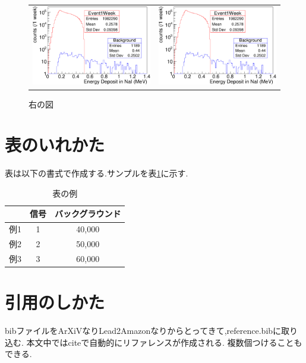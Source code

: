 \begin{figure}[tb]
\begin{tabular}{cc}
\centering

\begin{minipage}{0.5\hsize}
	\includegraphics[width=7cm]{fig/figure.pdf}
	\caption{左の図}
	\label{fig:test3}
\end{minipage}&

\begin{minipage}{0.5\hsize}
	\includegraphics[width=7cm]{fig/figure.pdf}
	\caption{右の図}
	\label{fig:test4}
\end{minipage}

\end{tabular}
\end{figure}


\section{表のいれかた}\label{sec:table}

表は以下の書式で作成する.サンプルを表\ref{tab:test5}に示す.
\begin{table}[tb]
	\centering
	\caption{表の例}
		\label{tab:test5}	
	  \begin{tabular}{lcc} 
		\hline
		 		&信号& バックグラウンド \\ 
		\hline \hline
		例1 	& 1	 & 40,000			\\
		例2 	& 2  & 50,000			\\
		例3 	& 3  & 60,000			\\
		\hline
	  \end{tabular}
\end{table}

\section{引用のしかた}\label{sec:ref}
bibファイルをArXiVなりLead2Amazonなりからとってきて,reference.bibに取り込む.
本文中ではciteで自動的にリファレンスが作成される\cite{myThesisTest1}.
複数個つけることもできる\cite{myThesisTest2,myWebsite}.


